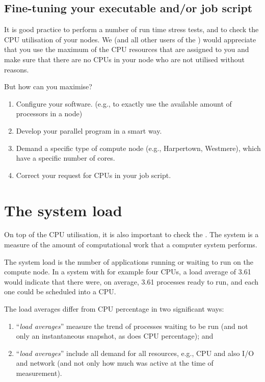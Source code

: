 \subsection{Fine-tuning your executable and/or job script}

It is good practice to perform a number of run time stress tests, and to check
the CPU utilisation of your nodes. We (and all other users of the \hpc) would
appreciate that you use the maximum of the CPU resources that are assigned to
you and make sure that there are no CPUs in your node who are not utilised
without reasons.

But how can you maximise?

\begin{enumerate}
\item  Configure your software. (e.g., to exactly use the available amount of processors in a node)
\item  Develop your parallel program in a smart way.
\item  Demand a specific type of compute node (e.g., Harpertown, Westmere), which have a specific number of cores.
\item  Correct your request for CPUs in your job script.
\end{enumerate}

\section{The system load}

On top of the CPU utilisation, it is also important to check the .  The system  is a measure of the amount of computational
work that a computer system performs.

The system load is the number of applications running or waiting to run on the
compute node.  In a system with for example four CPUs, a load average of 3.61
would indicate that there were, on average, 3.61 processes ready to run, and
each one could be scheduled into a CPU.

The load averages differ from CPU percentage in two significant ways:

\begin{enumerate}
\item  ``\emph{load averages}'' measure the trend of processes waiting to be run (and not only an instantaneous snapshot, as does CPU percentage); and
\item  ``\emph{load averages}'' include all demand for all resources, e.g., CPU and also I/O and network (and not only how much was active at the time of measurement).
\end{enumerate}

